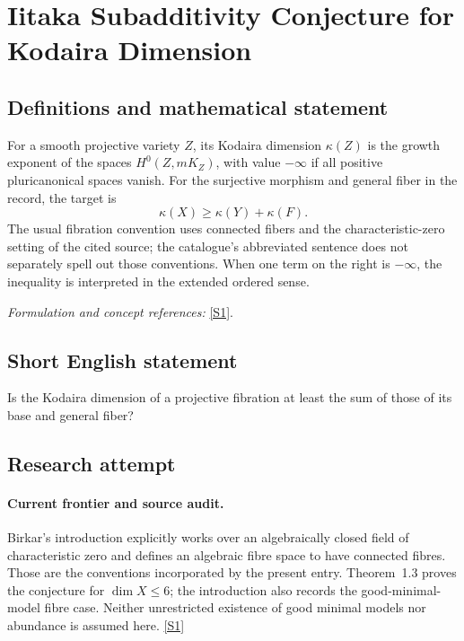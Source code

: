 \documentclass[11pt,a4paper]{article}
\newcommand{\sref}[2]{\hyperlink{source:#1:#2}{[S#2]}}
\newif\ifshowcatalogue
\newcommand{\cataloguescope}[1]{\ifshowcatalogue
 \paragraph{Exact scope in the supplied catalogue.}
 \begin{quote}\small #1\end{quote}\fi}
\numberwithin{equation}{section}
\begin{document}
\setcounter{section}{0}
\clearpage
\section*{\texorpdfstring{Iitaka Subadditivity Conjecture for Kodaira Dimension}{Iitaka Subadditivity Conjecture for Kodaira Dimension}}\label{statement}
\subsection{Definitions and mathematical statement}
For a smooth projective variety $Z$, its Kodaira dimension $\kappa(Z)$ is the growth exponent of the spaces $H^0(Z,mK_Z)$, with value $-\infty$ if all positive pluricanonical spaces vanish. For the surjective morphism and general fiber in the record, the target is
\[
 \kappa(X)\ge\kappa(Y)+\kappa(F).
\]
The usual fibration convention uses connected fibers and the characteristic-zero setting of the cited source; the catalogue's abbreviated sentence does not separately spell out those conventions. When one term on the right is $-\infty$, the inequality is interpreted in the extended ordered sense.
\par\smallskip\textit{Formulation and concept references:} \sref{statement}{1}.
\cataloguescope{Prove the Iitaka conjecture C\_\{n,m\}: for a surjective morphism f: X -> Y between smooth projective varieties with general fibre F, kappa(X) >= kappa(Y) + kappa(F).}
\subsection{Short English statement}
Is the Kodaira dimension of a projective fibration at least the sum of those of its base and general fiber?
\subsection{Research attempt}

\paragraph{Current frontier and source audit.}
Birkar's introduction explicitly works over an algebraically closed field
of characteristic zero and defines an algebraic fibre space to have
connected fibres. Those are the conventions incorporated by the present
entry. Theorem~1.3 proves the conjecture for $\dim X\leq6$; the introduction
also records the good-minimal-model fibre case. Neither unrestricted
existence of good minimal models nor abundance is assumed here.
\sref{statement}{1}
\end{document}
